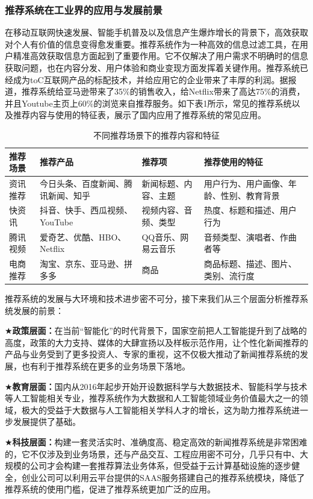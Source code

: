 \documentclass[withoutpreface,bwprint]{cumcmthesis} %
\begin{document}
	\subsubsection{ 推荐系统在工业界的应用与发展前景}
	在移动互联网快速发展、智能手机普及以及信息产生爆炸增长的背景下，高效获取对个人有价值的信息变得愈发重要。推荐系统作为一种高效的信息过滤工具，在用户精准高效获取信息方面起到了重要作用。它不仅解决了用户需求不明确时的信息获取问题，也在内容分发、用户体验和商业变现方面发挥着关键作用。推荐系统已经成为toC互联网产品的标配技术，并给应用它的企业带来了丰厚的利润。据报道，推荐系统给亚马逊带来了35\%的销售收入，给Netflix带来了高达75\%的消费，并且Youtube主页上60\%的浏览来自推荐服务。如下表1所示，常见的推荐系统以及推荐内容与使用的特征表，展示了国内应用了推荐系统的常见应用。\par
	\begin{table}[H]
		\centering
		\caption{不同推荐场景下的推荐内容和特征}
		\begin{tabular}{|m{2cm}|m{4cm}|m{4cm}|m{4cm}|}
			\hline
			推荐场景 & 推荐产品 & 推荐项 & 推荐使用的特征 \\
			\hline
			资讯推荐 & 今日头条、百度新闻、腾讯新闻、知乎 & 新闻标题、内容、主题 & 用户行为、用户画像、年龄、性别、教育背景 \\
			\hline
			快资讯 & 抖音、快手、西瓜视频、YouTube & 视频内容、音频、类型 & 热度、标题和描述、用户行为 \\
			\hline
			腾讯视频 & 爱奇艺、优酷、HBO、Netflix & QQ音乐、网易云音乐 & 音频类型、演唱者、作曲者等 \\
			\hline
			电商推荐 & 淘宝、京东、亚马逊、拼多多 & 商品 & 商品标题、描述、图片、类别、流行度 \\
			\hline
		\end{tabular}
	\end{table}
	推荐系统的发展与大环境和技术进步密不可分，接下来我们从三个层面分析推荐系统发展的前景：\par
	$\bigstar$\textbf{政策层面：}在当前“智能化”的时代背景下，国家空前把人工智能提升到了战略的高度，政策的大力支持、媒体的大肆宣扬以及样板示范作用，让个性化新闻推荐的产品与业务受到了更多投资人、专家的重视，这不仅极大推动了新闻推荐系统的发展，也有利于推荐系统在更多的业务场景下落地。\par
	$\bigstar$\textbf{教育层面：}国内从2016年起步开始开设数据科学与大数据技术、智能科学与技术等人工智能相关专业，推荐系统作为大数据和人工智能领域业务价值最大之一的领域，极大的受益于大数据与人工智能相关学科人才的增长，这为助力推荐系统进一步发展提供了基础。\par
	$\bigstar$\textbf{科技层面：}构建一套灵活实时、准确度高、稳定高效的新闻推荐系统是非常困难的，它不仅涉及到业务场景，还与产品交互、工程应用密不可分，几乎只有中、大规模的公司才会构建一套推荐算法业务体系，但受益于云计算基础设施的逐步健全，创业公司可以利用云平台提供的SAAS服务搭建自己的推荐系统模块，降低了推荐系统的使用门槛，促进了推荐系统更加广泛的应用。\par
\end{document}
